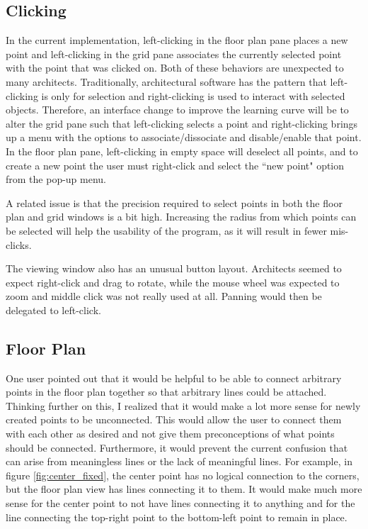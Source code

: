 \documentclass{thesis}
\begin{document}
\subsection{Clicking}
In the current implementation, left-clicking in the floor plan pane places a new point and left-clicking in the grid pane associates
the currently selected point with the point that was clicked on.  Both of these behaviors are unexpected to many architects.
Traditionally, architectural software has the pattern that left-clicking is only for selection and right-clicking is used to interact
with selected objects.  Therefore, an interface change to improve the learning curve will be to alter the grid pane such that
left-clicking selects a point and right-clicking brings up a menu with the options to associate/dissociate and disable/enable that
point.  In the floor plan pane, left-clicking in empty space will deselect all points, and to create a new point the user must
right-click and select the ``new point" option from the pop-up menu.

A related issue is that the precision required to select points in both the floor plan and grid windows is a bit high.  Increasing
the radius from which points can be selected will help the usability of the program, as it will result in fewer mis-clicks.

The viewing window also has an unusual button layout.  Architects seemed to expect right-click and drag to rotate, while the mouse
wheel was expected to zoom and middle click was not really used at all.  Panning would then be delegated to left-click.

\subsection{Floor Plan}
One user pointed out that it would be helpful to be able to connect arbitrary points in the floor plan together so that arbitrary
lines could be attached.  Thinking further on this, I realized that it would make a lot more sense for newly created points to be
unconnected.  This would allow the user to connect them with each other as desired and not give them preconceptions of what
points should be connected.  Furthermore, it would prevent the current confusion that can arise from meaningless lines or the
lack of meaningful lines.  For example, in figure \ref{fig:center_fixed}, the center point has no logical connection to the corners,
but the floor plan view has lines connecting it to them.  It would make much more sense for the center point to not have lines
connecting it to anything and for the line connecting the top-right point to the bottom-left point to remain in place.
\end{document}
